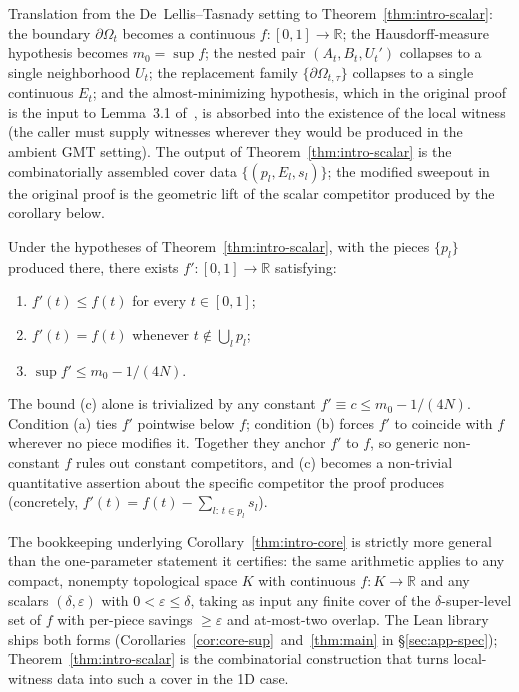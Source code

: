 Translation from the De~Lellis--Tasnady setting to
Theorem~\ref{thm:intro-scalar}: the boundary $\partial \Omega_t$
becomes a continuous $f : [0,1] \to \mathbb{R}$; the
Hausdorff-measure hypothesis becomes $m_0 = \sup f$; the nested
pair $(A_t, B_t, U_t')$ collapses to a single neighborhood $U_t$;
the replacement family $\{\partial \Omega_{t,\tau}\}$ collapses
to a single continuous $E_t$; and the almost-minimizing
hypothesis, which in the original proof is the input to
Lemma~3.1 of~\cite{DLT13}, is absorbed into the existence of the
local witness (the caller must supply witnesses wherever they
would be produced in the ambient GMT setting). The output of
Theorem~\ref{thm:intro-scalar} is the combinatorially assembled
cover data $\{(p_l, E_l, s_l)\}$; the modified sweepout in the
original proof is the geometric lift of the scalar competitor
produced by the corollary below.

\begin{corollary}
\label{thm:intro-core}
Under the hypotheses of Theorem~\ref{thm:intro-scalar}, with the
pieces $\{p_l\}$ produced there, there exists
$f' : [0,1] \to \mathbb{R}$ satisfying:
\begin{enumerate}
\item[\textup{(a)}] $f'(t) \le f(t)$ for every $t \in [0,1]$;
\item[\textup{(b)}] $f'(t) = f(t)$ whenever $t \notin \bigcup_l p_l$;
\item[\textup{(c)}] $\sup f' \le m_0 - 1/(4N)$.
\end{enumerate}
\end{corollary}

\begin{remark}
\label{rem:anchor-f-prime}
The bound (c) alone is trivialized by any constant
$f' \equiv c \le m_0 - 1/(4N)$. Condition (a) ties $f'$
pointwise below $f$; condition (b) forces $f'$ to coincide with
$f$ wherever no piece modifies it. Together they anchor $f'$ to
$f$, so generic non-constant $f$ rules out constant competitors,
and (c) becomes a non-trivial quantitative assertion about the
specific competitor the proof produces
(concretely, $f'(t) = f(t) - \sum_{l :\, t \in p_l} s_l$).
\end{remark}

The bookkeeping underlying Corollary~\ref{thm:intro-core} is
strictly more general than the one-parameter statement it
certifies: the same arithmetic applies to any compact, nonempty
topological space $K$ with continuous $f : K \to \mathbb{R}$ and
any scalars $(\delta, \varepsilon)$ with
$0 < \varepsilon \le \delta$, taking as input any finite cover of
the $\delta$-super-level set of $f$ with per-piece savings $\ge
\varepsilon$ and at-most-two overlap. The Lean library ships
both forms (Corollaries~\ref{cor:core-sup}~and~\ref{thm:main} in
\S\ref{sec:app-spec}); Theorem~\ref{thm:intro-scalar} is the
combinatorial construction that turns local-witness data into
such a cover in the 1D case.

